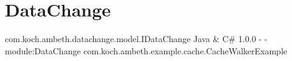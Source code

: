 \section{DataChange}
\label{feature:DataChange}
\ClearAPI
\TODO
\feature
	{com.koch.ambeth.datachange.model.IDataChange}
	{Java \& C\#}
	{1.0.0}
	{-}
	{-}
	{module:DataChange}
	{com.koch.ambeth.example.cache.CacheWalkerExample}